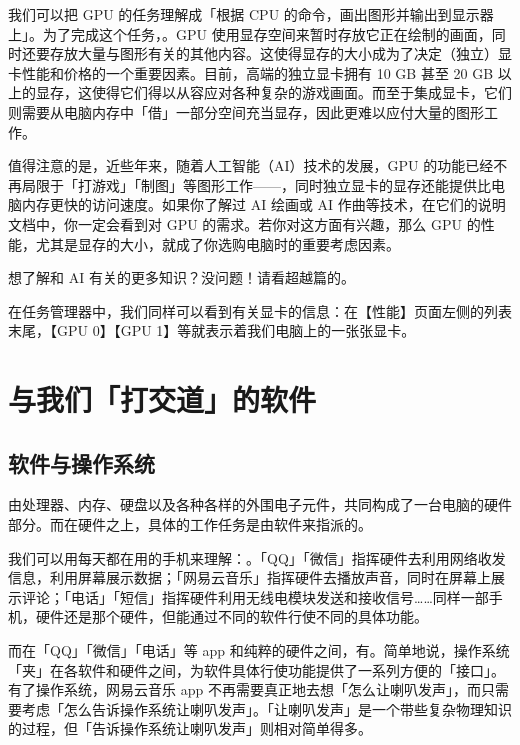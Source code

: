我们可以把 GPU 的任务理解成「根据 CPU 的命令，画出图形并输出到显示器上」。为了完成这个任务，。GPU 使用显存空间来暂时存放它正在绘制的画面，同时还要存放大量与图形有关的其他内容。这使得显存的大小成为了决定（独立）显卡性能和价格的一个重要因素。目前，高端的独立显卡拥有 10 GB 甚至 20 GB 以上的显存，这使得它们得以从容应对各种复杂的游戏画面。而至于集成显卡，它们则需要从电脑内存中「借」一部分空间充当显存，因此更难以应付大量的图形工作。

值得注意的是，近些年来，随着人工智能（AI）技术的发展，GPU 的功能已经不再局限于「打游戏」「制图」等图形工作——，同时独立显卡的显存还能提供比电脑内存更快的访问速度。如果你了解过 AI 绘画或 AI 作曲等技术，在它们的说明文档中，你一定会看到对 GPU 的需求。若你对这方面有兴趣，那么 GPU 的性能，尤其是显存的大小，就成了你选购电脑时的重要考虑因素。

\begin{note}
  想了解和 AI 有关的更多知识？没问题！请看超越篇的。
\end{note}

在任务管理器中，我们同样可以看到有关显卡的信息：在【性能】页面左侧的列表末尾，【GPU 0】【GPU 1】等就表示着我们电脑上的一张张显卡。

\section{与我们「打交道」的软件}

\subsection{软件与操作系统}

由处理器、内存、硬盘以及各种各样的外围电子元件，共同构成了一台电脑的硬件部分。而在硬件之上，具体的工作任务是由软件来指派的。

我们可以用每天都在用的手机来理解：。「QQ」「微信」指挥硬件去利用网络收发信息，利用屏幕展示数据；「网易云音乐」指挥硬件去播放声音，同时在屏幕上展示评论；「电话」「短信」指挥硬件利用无线电模块发送和接收信号……同样一部手机，硬件还是那个硬件，但能通过不同的软件行使不同的具体功能。

而在「QQ」「微信」「电话」等 app 和纯粹的硬件之间，有。简单地说，操作系统「夹」在各软件和硬件之间，为软件具体行使功能提供了一系列方便的「接口」。有了操作系统，网易云音乐 app 不再需要真正地去想「怎么让喇叭发声」，而只需要考虑「怎么告诉操作系统让喇叭发声」。「让喇叭发声」是一个带些复杂物理知识的过程，但「告诉操作系统让喇叭发声」则相对简单得多。

